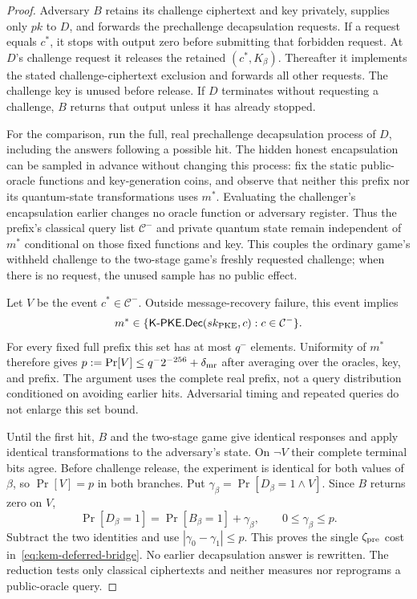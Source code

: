 \begin{proof}
Adversary $B$ retains its challenge ciphertext and key privately, supplies
only $pk$ to $D$, and forwards the prechallenge decapsulation requests.
If a request equals $c^*$, it stops with output zero before submitting
that forbidden request. At $D$'s challenge request it releases the retained
$(c^*,K_\beta)$. Thereafter it implements the stated challenge-ciphertext
exclusion and forwards all other requests. The challenge key is unused
before release. If $D$ terminates without requesting a challenge, $B$
returns that output unless it has already stopped.

For the comparison, run the full, real prechallenge decapsulation process
of $D$, including the answers following a possible hit. The hidden honest
encapsulation can be sampled in advance without changing this process:
fix the static public-oracle functions and key-generation coins, and
observe that neither this prefix nor its quantum-state transformations
uses $m^*$. Evaluating the challenger's encapsulation earlier changes no
oracle function or adversary register. Thus the prefix's classical query
list $\mathcal C^-$ and private quantum state remain independent of
$m^*$ conditional on those fixed functions and key. This couples the
ordinary game's withheld challenge to the two-stage game's freshly
requested challenge; when there is no request, the unused sample has no
public effect.

Let $V$ be the event $c^*\in\mathcal C^-$. Outside message-recovery
failure, this event implies
\[
 m^*\in
 \{\mathsf{K\mbox{-}PKE.Dec}(sk_{\rm PKE},c):
                                      c\in\mathcal C^-\}.
\]
For every fixed full prefix this set has at most $q^-$ elements. Uniformity
of $m^*$ therefore gives
$p:=\Pr[V]\le q^-2^{-256}+\delta_{\rm mr}$ after averaging over the
oracles, key, and prefix. The argument uses the complete real prefix,
not a query distribution conditioned on avoiding earlier hits.
Adversarial timing and repeated queries do not enlarge this set bound.

Until the first hit, $B$ and the two-stage game give identical responses
and apply identical transformations to the adversary's state. On
$\neg V$ their complete terminal bits agree. Before challenge release,
the experiment is identical for both values of $\beta$, so $\Pr[V]=p$ in
both branches. Put
$\gamma_\beta=\Pr[D_\beta=1\land V]$. Since $B$ returns zero on $V$,
\[
 \Pr[D_\beta=1]=\Pr[B_\beta=1]+\gamma_\beta,
 \qquad 0\le\gamma_\beta\le p.
\]
Subtract the two identities and use
$|\gamma_0-\gamma_1|\le p$. This proves the single
$\zeta_{\rm pre}$ cost in~\eqref{eq:kem-deferred-bridge}.
No earlier decapsulation answer is rewritten. The reduction tests only
classical ciphertexts and neither measures nor reprograms a public-oracle
query.
\end{proof}

